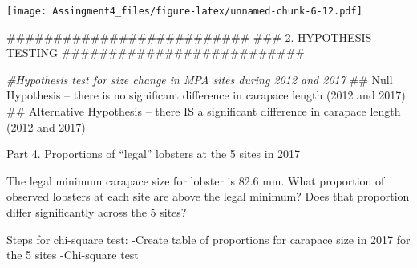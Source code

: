 \documentclass[]{article}
\newenvironment{Shaded}{\begin{snugshade}}{\end{snugshade}}
\newcommand{\KeywordTok}[1]{\textcolor[rgb]{0.13,0.29,0.53}{\textbf{#1}}}
\newcommand{\DataTypeTok}[1]{\textcolor[rgb]{0.13,0.29,0.53}{#1}}
\newcommand{\DecValTok}[1]{\textcolor[rgb]{0.00,0.00,0.81}{#1}}
\newcommand{\StringTok}[1]{\textcolor[rgb]{0.31,0.60,0.02}{#1}}
\newcommand{\CommentTok}[1]{\textcolor[rgb]{0.56,0.35,0.01}{\textit{#1}}}
\newcommand{\OperatorTok}[1]{\textcolor[rgb]{0.81,0.36,0.00}{\textbf{#1}}}
\newcommand{\AlertTok}[1]{\textcolor[rgb]{0.94,0.16,0.16}{#1}}
\newcommand{\NormalTok}[1]{#1}
\begin{document}
\texttt{[image: Assingment4\_files/figure-latex/unnamed-chunk-6-12.pdf]}

\begin{Shaded}
\begin{Highlighting}[]
\NormalTok{##########################}
\NormalTok{### 2. HYPOTHESIS }\AlertTok{TESTING} 
\NormalTok{##########################}

\CommentTok{#Hypothesis test for size change in MPA sites during 2012 and 2017}
\NormalTok{  ## Null Hypothesis -- there is no significant difference in carapace length (2012 and 2017)}
\NormalTok{  ## Alternative Hypothesis -- there IS a significant difference in carapace length (2012 and             2017)}
\end{Highlighting}
\end{Shaded}

Part 4. Proportions of ``legal'' lobsters at the 5 sites in 2017

The legal minimum carapace size for lobster is 82.6 mm. What proportion
of observed lobsters at each site are above the legal minimum? Does that
proportion differ significantly across the 5 sites?

Steps for chi-square test: -Create table of proportions for carapace
size in 2017 for the 5 sites -Chi-square test

\begin{Shaded}
\end{Shaded}
\end{document}
